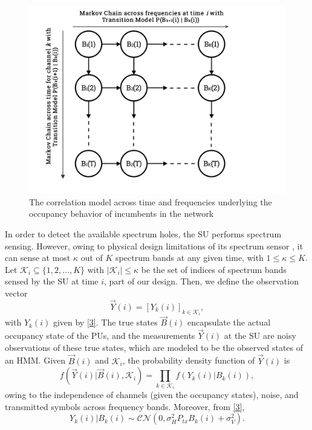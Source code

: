 \documentclass[10pt,twocolumn]{IEEEtran}
\begin{document}
\begin{figure} [t]
    \centering
    \includegraphics[width=0.8\linewidth]{System_Model_2.png}
    \caption{The correlation model across time and frequencies underlying the occupancy behavior of incumbents in the network}
    \label{fig:1}
    \vspace{-6mm}
\end{figure}

In order to detect the available spectrum holes, the SU performs spectrum sensing. However, owing to physical design limitations of its spectrum sensor \cite{5990482}, it can sense at most $\kappa$ out of $K$ spectrum bands at any given time, with $1{\leq}\kappa{\leq}K$. Let $\mathcal K_{i}{\subseteq}\{1,2,\dots,K\}$ with $|\mathcal K_i|{\leq}\kappa$ be the set of indices of spectrum bands sensed by the SU at time $i$, part of our design.
Then, we define the observation vector
\begin{equation}\label{8}
    \vec{Y}(i) = [Y_k(i)]_{k {\in} \mathcal K_i},
\end{equation}
with $Y_k(i)$ given by \eqref{3}.
The true states $\vec{B}(i)$ encapsulate the actual occupancy state of the PUs, and the measurements $\vec{Y}(i)$ at the SU are noisy observations of these true states, which are modeled to be the observed states of an HMM. Given $\vec{B}(i)$ and $\mathcal K_i$, the probability density function of $\vec{Y}(i)$ is
\begin{equation}\label{9}
    f(\vec{Y}(i)|\vec{B}(i), \mathcal K_i) = \prod_{k \in \mathcal K_i} f(Y_k(i)|B_k(i)),
\end{equation}
owing to the independence of channels (given the occupancy states), noise, and transmitted symbols across frequency bands. Moreover, from \eqref{3},
\begin{equation}\label{10}
 Y_k(i)|B_k(i) \sim \mathcal{CN}(0, \sigma_H^2P_{tx}B_k(i) + \sigma_V^2).
\end{equation}
\end{document}
